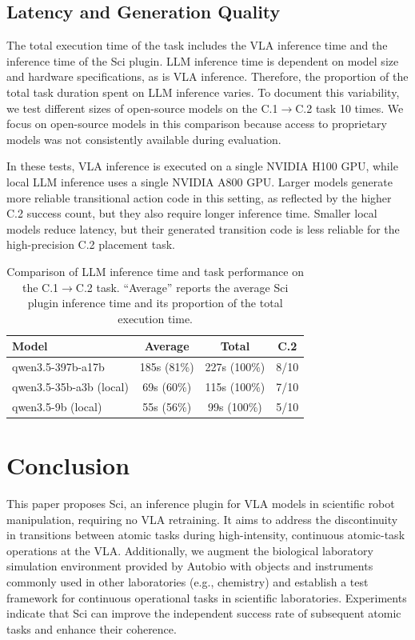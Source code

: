 \documentclass[letterpaper]{article} %
\begin{document}
\subsection{Latency and Generation Quality}
The total execution time of the task includes the VLA inference time and the inference time of the Sci plugin. LLM inference time is dependent on model size and hardware specifications, as is VLA inference. Therefore, the proportion of the total task duration spent on LLM inference varies. To document this variability, we test different sizes of open-source models on the C.1$\rightarrow$C.2 task 10 times. We focus on open-source models in this comparison because access to proprietary models was not consistently available during evaluation.

In these tests, VLA inference is executed on a single NVIDIA H100 GPU, while local LLM inference uses a single NVIDIA A800 GPU. Larger models generate more reliable transitional action code in this setting, as reflected by the higher C.2 success count, but they also require longer inference time. Smaller local models reduce latency, but their generated transition code is less reliable for the high-precision C.2 placement task.

\begin{table}[t]
\begin{tabular}{lccc}
\toprule
Model & Average & Total & C.2 \\
\midrule
qwen3.5-397b-a17b & 185s (81\%) & 227s (100\%) & 8/10 \\
qwen3.5-35b-a3b (local) & 69s (60\%) & 115s (100\%) & 7/10 \\
qwen3.5-9b (local) & 55s (56\%) & 99s (100\%) & 5/10 \\
\bottomrule
\end{tabular}
\caption{Comparison of LLM inference time and task performance on the C.1$\rightarrow$C.2 task. ``Average'' reports the average Sci plugin inference time and its proportion of the total execution time.}
\label{tab:llm_inference_time}
\end{table}


\section{Conclusion}
This paper proposes Sci, an inference plugin for VLA models in scientific robot manipulation, requiring no VLA retraining. It aims to address the discontinuity in transitions between atomic tasks during high-intensity, continuous atomic-task operations at the VLA.
 Additionally, we augment the biological laboratory simulation environment provided by Autobio with objects and instruments commonly used in other laboratories (e.g., chemistry) and establish a test framework for continuous operational tasks in scientific laboratories.
 Experiments indicate that Sci can improve the independent success rate of subsequent atomic tasks and enhance their coherence.
\end{document}
